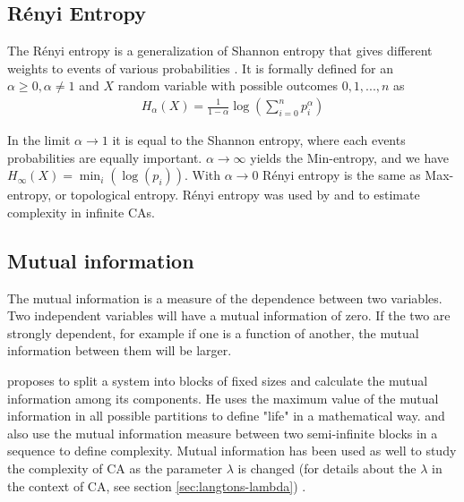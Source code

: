 \subsection{Rényi Entropy}
The Rényi entropy is a generalization of Shannon entropy that gives different
weights to events of various probabilities
\parencite{renyiMeasuresEntropyInformation1961}. It is formally defined for an
$\alpha \geq 0, \alpha \neq 1$ and $X$ random variable with possible outcomes $0, 1, ..., n$ as
\begin{align*}
  H_\alpha(X) = \frac{1}{1-\alpha} \log\left(\sum_{i=0}^np_i^\alpha\right)
\end{align*}

In the limit $\alpha \rightarrow 1$ it is equal to the Shannon entropy, where each events
probabilities are equally important. $\alpha \rightarrow \infty$ yields the Min-entropy, and we have
$H_{\infty} (X) = \min_{i}(\log(p_{i}))$. With $\alpha \rightarrow 0$ Rényi entropy is the same as
Max-entropy, or topological entropy. Rényi entropy was used by
\textcite{wolframStatisticalMechanicsCellular1983} and
\textcite{lindgrenComplexityMeasuresCellular1988} to estimate complexity in
infinite \acp{CA}.

\subsection{Mutual information}
The mutual information is a measure of the dependence between two variables. Two
independent variables will have a mutual information of zero. If the two are
strongly dependent, for example if one is a function of another, the mutual
information between them will be larger.

\textcite{chaitinMathematicalDefinitionLife1987} proposes to split a system into
blocks of fixed sizes and calculate the mutual information among its components.
He uses the maximum value of the mutual information in all possible partitions
to define "life" in a mathematical way. \textcite{shawDrippingFaucetModel1984}
and \textcite{grassbergerQuantitativeTheorySelfgenerated1986} also use the
mutual information measure between two semi-infinite blocks in a sequence to
define complexity. Mutual information has been used as well to study the
complexity of \ac{CA} as the parameter $\lambda$ is changed (for details
about the $\lambda$ in the context of \ac{CA}, see section \ref{sec:langtons-lambda})
\parencite{gutowitzMethodsDesigningCellular1988,
  liTransitionPhenomenaCellular1990}.


